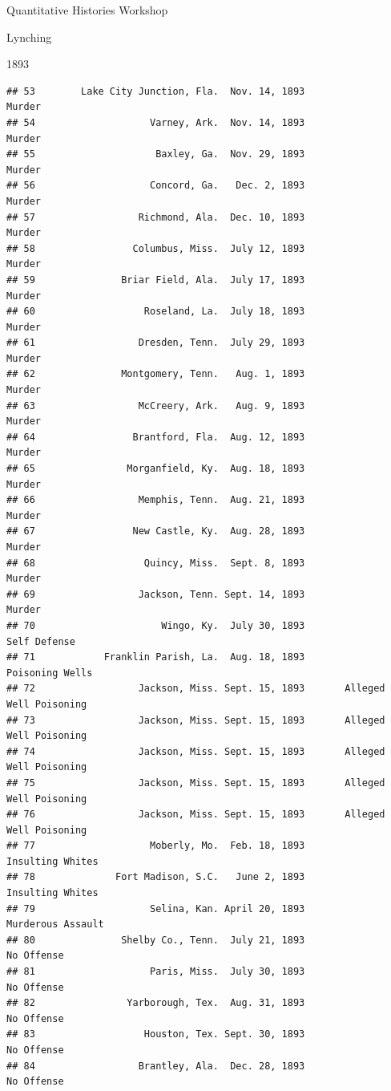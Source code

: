\documentclass[
  ignorenonframetext,
]{beamer}
\begin{document}
\begin{frame}[fragile]{Quantitative Histories Workshop}
\begin{block}{Lynching}
\begin{block}{1893}
\begin{verbatim}
## 53        Lake City Junction, Fla.  Nov. 14, 1893                       Murder
## 54                    Varney, Ark.  Nov. 14, 1893                       Murder
## 55                     Baxley, Ga.  Nov. 29, 1893                       Murder
## 56                    Concord, Ga.   Dec. 2, 1893                       Murder
## 57                  Richmond, Ala.  Dec. 10, 1893                       Murder
## 58                 Columbus, Miss.  July 12, 1893                       Murder
## 59               Briar Field, Ala.  July 17, 1893                       Murder
## 60                   Roseland, La.  July 18, 1893                       Murder
## 61                  Dresden, Tenn.  July 29, 1893                       Murder
## 62               Montgomery, Tenn.   Aug. 1, 1893                       Murder
## 63                  McCreery, Ark.   Aug. 9, 1893                       Murder
## 64                 Brantford, Fla.  Aug. 12, 1893                       Murder
## 65                Morganfield, Ky.  Aug. 18, 1893                       Murder
## 66                  Memphis, Tenn.  Aug. 21, 1893                       Murder
## 67                 New Castle, Ky.  Aug. 28, 1893                       Murder
## 68                   Quincy, Miss.  Sept. 8, 1893                       Murder
## 69                  Jackson, Tenn. Sept. 14, 1893                       Murder
## 70                      Wingo, Ky.  July 30, 1893                 Self Defense
## 71            Franklin Parish, La.  Aug. 18, 1893              Poisoning Wells
## 72                  Jackson, Miss. Sept. 15, 1893       Alleged Well Poisoning
## 73                  Jackson, Miss. Sept. 15, 1893       Alleged Well Poisoning
## 74                  Jackson, Miss. Sept. 15, 1893       Alleged Well Poisoning
## 75                  Jackson, Miss. Sept. 15, 1893       Alleged Well Poisoning
## 76                  Jackson, Miss. Sept. 15, 1893       Alleged Well Poisoning
## 77                    Moberly, Mo.  Feb. 18, 1893             Insulting Whites
## 78              Fort Madison, S.C.   June 2, 1893             Insulting Whites
## 79                    Selina, Kan. April 20, 1893            Murderous Assault
## 80               Shelby Co., Tenn.  July 21, 1893                   No Offense
## 81                    Paris, Miss.  July 30, 1893                   No Offense
## 82                Yarborough, Tex.  Aug. 31, 1893                   No Offense
## 83                   Houston, Tex. Sept. 30, 1893                   No Offense
## 84                  Brantley, Ala.  Dec. 28, 1893                   No Offense

\end{verbatim}
\end{block}
\end{block}
\end{frame}
\end{document}
